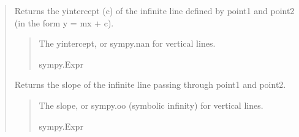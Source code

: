 \documentclass[letterpaper,10pt,english]{sphinxmanual}
\begin{document}
\begin{quote}
\begin{fulllineitems}
\begin{fulllineitems}
\end{fulllineitems}


\begin{fulllineitems}
\label{\detokenize{pygeox:pygeox.basic_objects.LineLike.intercept}}
\pysigstartsignatures
\pysigline
{}
\pysigstopsignatures
\sphinxAtStartPar
Returns the y\sphinxhyphen{}intercept (c) of the infinite line defined by point1 and point2
(in the form y = mx + c).
\begin{quote}\begin{description}
\sphinxAtStartPar
The y\sphinxhyphen{}intercept, or sympy.nan for vertical lines.

\sphinxAtStartPar
sympy.Expr

\end{description}\end{quote}

\end{fulllineitems}


\begin{fulllineitems}
\label{\detokenize{pygeox:pygeox.basic_objects.LineLike.slope}}
\pysigstartsignatures
\pysigline
{}
\pysigstopsignatures
\sphinxAtStartPar
Returns the slope of the infinite line passing through point1 and point2.
\begin{quote}\begin{description}
\sphinxAtStartPar
The slope, or sympy.oo (symbolic infinity) for vertical lines.

\sphinxAtStartPar
sympy.Expr

\end{description}\end{quote}


\end{fulllineitems}
\end{fulllineitems}
\end{quote}
\end{document}
